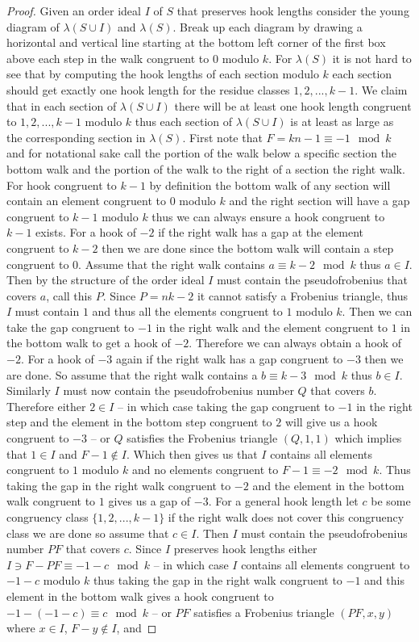 \documentclass[11pt,letterpaper]{article}
\theoremstyle{definition}
\begin{document}
\begin{proof}
    Given an order ideal $I$ of $S$ that preserves hook lengths consider the young diagram of $\lambda(S\cup I)$ and $\lambda(S)$. Break up each diagram by drawing a horizontal and vertical line starting at the bottom left corner of the first box above each step in the walk congruent to $0$ modulo $k$. For $\lambda(S)$ it is not hard to see that by computing the hook lengths of each section modulo $k$ each section should get exactly one hook length for the residue classes $1,2,...,k-1$. We claim that in each section of $\lambda(S\cup I)$ there will be at least one hook length congruent to $1,2,...,k-1$ modulo $k$ thus each section of $\lambda(S\cup I)$ is at least as large as the corresponding section in $\lambda(S)$. First note that $F=kn-1\equiv -1\mod k$ and for notational sake call the portion of the walk below a specific section the bottom walk and the portion of the walk to the right of a section the right walk. For hook congruent to $k-1$ by definition the bottom walk of any section will contain an element congruent to $0$ modulo $k$ and the right section will have a gap congruent to $k-1$ modulo $k$ thus we can always ensure a hook congruent to $k-1$ exists. For a hook of $-2$ if the right walk has a gap at the element congruent to $k-2$ then we are done since the bottom walk will contain a step congruent to $0$. Assume that the right walk contains $a\equiv k-2\mod k$ thus $a\in I$. Then by the structure of the order ideal $I$ must contain the pseudofrobenius that covers $a$, call this $P$. Since $P=nk-2$ it cannot satisfy a Frobenius triangle, thus $I$ must contain $1$ and thus all the elements congruent to $1$ modulo $k$. Then we can take the gap congruent to $-1$ in the right walk and the element congruent to $1$ in the bottom walk to get a hook of $-2$. Therefore we can always obtain a hook of $-2$. For a hook of $-3$ again if the right walk has a gap congruent to $-3$ then we are done. So assume that the right walk contains a $b\equiv k-3 \mod k$ thus $b\in I$. Similarly $I$ must now contain the pseudofrobenius number $Q$ that covers $b$. Therefore either $2\in I$ -- in which case taking the gap congruent to $-1$ in the right step and the element in the bottom step congruent to $2$ will give us a hook congruent to $-3$ -- or $Q$ satisfies the Frobenius triangle $(Q,1,1)$ which implies that $1\in I$ and $F-1\notin I$. Which then gives us that $I$ contains all elements congruent to $1$ modulo $k$ and no elements congruent to $F-1\equiv -2 \mod k$. Thus taking the gap in the right walk congruent to $-2$ and the element in the bottom walk congruent to $1$ gives us a gap of $-3$. For a general hook length let $c$ be some congruency class $\{1,2,...,k-1\}$ if the right walk does not cover this congruency class we are done so assume that $c\in I$. Then $I$ must contain the pseudofrobenius number $PF$ that covers $c$. Since $I$ preserves hook lengths either $I\ni F-PF\equiv -1-c\mod k$ -- in which case $I$ contains all elements congruent to $-1-c$ modulo $k$ thus taking the gap in the right walk congruent to $-1$ and this element in the bottom walk gives a hook congruent to $-1-(-1-c)\equiv c\mod k$ -- or $PF$ satisfies a Frobenius triangle $(PF,x,y)$ where $x\in I$, $F-y\notin I$, and 
\end{proof}
\end{document}
